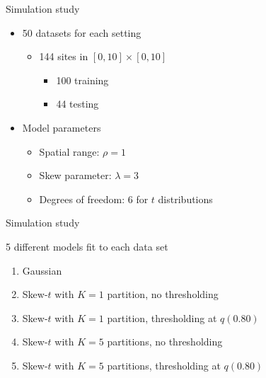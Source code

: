 \documentclass{beamer}
\begin{document}
\begin{frame}{Simulation study}
  \begin{itemize} \setlength{\itemsep}{1em}
    \item 50 datasets for each setting \vspace{0.5em}
    \begin{itemize} \setlength{\itemsep}{0.5em}
      \item 144 sites in $[0, 10] \times [0, 10]$ \vspace{0.25em}
      \begin{itemize} \setlength{\itemsep}{0.25em}
        \item 100 training
        \item 44 testing
      \end{itemize}
    \end{itemize}
    \item Model parameters \vspace{0.5em}
    \begin{itemize} \setlength{\itemsep}{0.5em}
      \item Spatial range: $\rho = 1$
      \item Skew parameter: $\lambda = 3$
      \item Degrees of freedom: 6 for $t$ distributions
    \end{itemize}
  \end{itemize}
\end{frame}

\begin{frame}{Simulation study}
\begin{adjustwidth}{1em}{0em}
  5 different models fit to each data set \vspace{0.5em}
  \begin{enumerate}[1.] \setlength{\itemsep}{0.5em}
    \item Gaussian
    \item Skew-$t$ with $K = 1$ partition, no thresholding
    \item Skew-$t$ with $K = 1$ partition, thresholding at $q(0.80)$
    \item Skew-$t$ with $K = 5$ partitions, no thresholding
    \item Skew-$t$ with $K = 5$ partitions, thresholding at $q(0.80)$
  \end{enumerate}
\end{adjustwidth}
\end{frame}
\end{document}
